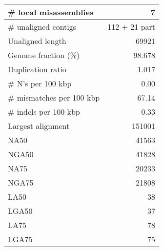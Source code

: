 \documentclass[12pt,a4paper]{article}
\begin{document}
\begin{table}[ht]
\begin{center}
\begin{tabular}{|l*{1}{|r}|}
\# local misassemblies & 7 \\ \hline
\# unaligned contigs & 112 + 21 part \\ \hline
Unaligned length & 69921 \\ \hline
Genome fraction (\%) & 98.678 \\ \hline
Duplication ratio & 1.017 \\ \hline
\# N's per 100 kbp & 0.00 \\ \hline
\# mismatches per 100 kbp & 67.14 \\ \hline
\# indels per 100 kbp & 0.33 \\ \hline
Largest alignment & 151001 \\ \hline
NA50 & 41563 \\ \hline
NGA50 & 41828 \\ \hline
NA75 & 20233 \\ \hline
NGA75 & 21808 \\ \hline
LA50 & 38 \\ \hline
LGA50 & 37 \\ \hline
LA75 & 78 \\ \hline
LGA75 & 75 \\ \hline
\end{tabular}
\end{center}
\end{table}
\end{document}
